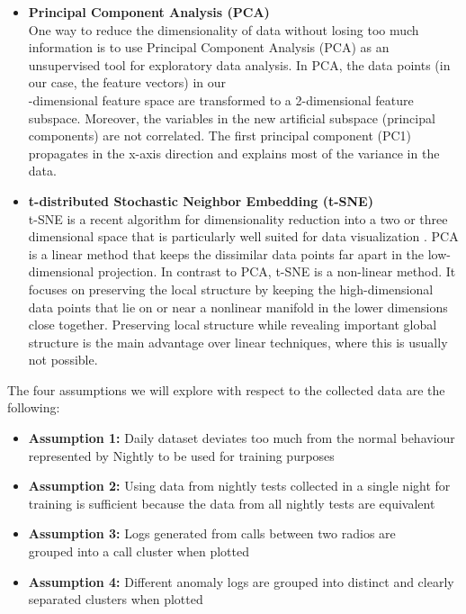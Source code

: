 \begin{itemize} 

\item \textbf{Principal Component Analysis (PCA)} \\ One way to reduce the dimensionality of data without losing too much information is to use Principal Component Analysis (PCA) as an unsupervised tool for exploratory data analysis. In PCA, the data points (in our case, the feature vectors) in our\\ \featureVectorLength-dimensional feature space are transformed to a 2-dimensional feature subspace. Moreover, the variables in the new artificial subspace (principal components) are not correlated. The first principal component (PC1) propagates in the x-axis direction and explains most of the variance in the data.
    
   \item \textbf{t-distributed Stochastic Neighbor Embedding (t-SNE)}\\ t-SNE is a recent algorithm for dimensionality reduction into a two or three dimensional space that is particularly well suited for data visualization \cite{tsne}. PCA is a linear method that keeps the dissimilar data points far apart in the low-dimensional projection. In contrast to PCA, t-SNE is a non-linear method. It focuses on preserving the local structure by keeping the high-dimensional data points that lie on or near a nonlinear manifold in the lower dimensions close together. Preserving local structure while revealing important global structure is the main advantage over linear techniques, where this is usually not possible.
    
\end{itemize}

The four assumptions we will explore with respect to the collected data are the following: 

\begin{itemize} 
    \item \textbf{Assumption 1:} Daily dataset deviates too much from the normal behaviour represented by Nightly to be used for training purposes 
    \item \textbf{Assumption 2:} Using data from nightly tests collected in a single night for training is sufficient because the data from all nightly tests are equivalent 
    \item \textbf{Assumption 3:} Logs generated from calls between two radios are\\
    grouped into a call cluster when plotted 
    \item \textbf{Assumption 4:} Different anomaly logs are grouped into distinct and clearly separated clusters when plotted
\end{itemize}


